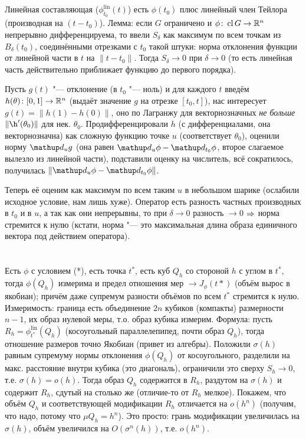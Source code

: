 \section{} %
Линейная составляющая ($\phi^{\mathup{lin}}_{t_0} (t)$) есть $\phi(t_0)$ плюс линейный член Тейлора (производная на $(t-t_0)$).
Лемма: если $G$ ограничено и $\phi \colon \operatorname{cl} G \to \mathbb{R}^n$ непрерывно дифференцируема, то ввели $S_\delta$ как максимум
по всем точкам из $B_\delta(t_0)$, соединёнными отрезками с $t_0$ такой штуки: норма отклонения функции от линейной части в $t$ на $\|t-t_0\|$.
Тогда $S_\delta \to 0$ при $\delta \to 0$ (то есть линейная часть действительно приближает функцию до первого порядка).

Пусть $g(t)$ "--- отклонение (в $t_0$ "--- ноль) и для каждого $t$ введём $h(\theta) \colon [0,1] \to \mathbb{R}^n$ (выдаёт значение $g$ на отрезке $[t_0, t]$),
нас интересует $g(t)=\|h(1)-h(0)\|$, оно по Лагранжу для векторнозначных \textit{не больше} $\|\h'(\theta_0)\|$ для нек. $\theta_0$.
Продифференцировали $h$ (с дифференциалами, она векторнозначна) как сложную функцию точке $u$ (соответствует $\theta_0$), оценили норму $\d_u g$
(она равен $\d_u \phi - \d_{t_0} \phi$, второе слагаемое вылезло из линейной части), подставили оценку на числитель, всё сократилось, получилась $\|\d_u \phi - \d_{t_0} \phi\|$.

Теперь её оценим как максимум по всем таким $u$ в небольшом шарике (ослабили исходное условие, нам лишь хуже).
Оператор есть разность частных производных в $t_0$ и в $u$, а так как они непрерывны, то при $\delta\to0$ разность $\to 0$ $\Rightarrow$ норма стремится к нулю
(кстати, норма "--- это максимальная длина образа единичного вектора под действием оператора).

\section{} %
Есть $\phi$ с условием (*), есть точка $t^*$, есть куб $Q_h$ со стороной $h$ с углом в $t^*$, тогда $\phi(Q_h)$ измерима и предел отношения мер $\to J_{\phi}(t*)$
(объём вырос в якобиан); причём даже супремум разности объёмов по всем $t^*$ стремится к нулю.
Измеримость: граница есть объединение $2n$ кубиков (компакты) размерности $n-1$, их образ нулевой меры, т.о. образ кубика измерим.
Формула: пусть $R_h=\phi^{\mathup{lin}}_{t^*}(Q_h)$ (косоугольный параллелепипед, почти образ $Q_h$), тогда отношение размеров точно Якобиан (привет из алгебры).
Положили $\sigma(h)$ равным супремуму нормы отклонения $\phi(Q_h)$ от косоугольного, разделили на макс. расстояние внутри кубика (это диагональ), ограничили это сверху $S_h \to 0$,
т.е. $\sigma(h)=o(h)$.
Тогда образ $Q_h$ содержится в $R_h$, раздутом на $\sigma(h)$ и содержит $R_h$, сдутый на столько же (отличие-то от $R_h$ мелкое).
Покажем, что объём $Q_h$ и соответствующей модификации $R_h$ отличается на $o(h^n)$ (получим, что надо, потому что $\mu Q_h = h^n$).
Это просто: грань модификации увеличилась на $\sigma(h)$, объём увеличился на $O(\sigma^n(h))$, т.е. $o(h^n)$.

